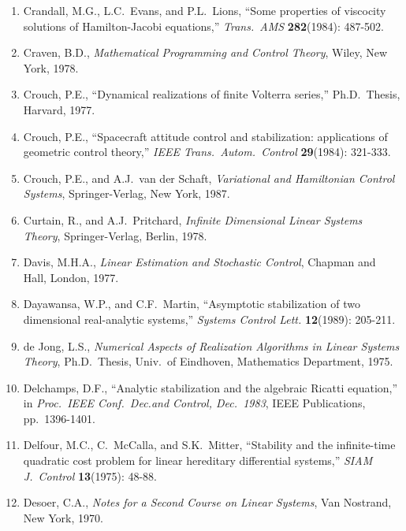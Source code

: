 \begin{enumerate}
\item
Crandall, M.G., L.C.\ Evans, and P.L.\ Lions, ``Some properties of viscocity
solutions of Ham\-ilton-Jac\-obi equations,'' {\it Trans.\ AMS} {\bf
282}(1984): 487-502.

\item
Craven, B.D., {\it Mathematical Programming and Control Theory}, Wiley, New
York, 1978.

\item
Crouch, P.E., ``Dynamical realizations of finite Volterra series,'' Ph.D.\
Thesis, Harvard, 1977.

\item
Crouch, P.E., ``Spacecraft attitude control and stabilization: applications of
geometric control theory,'' {\it IEEE Trans.\ Autom.\ Control} {\bf 29}(1984):
321-333.

\item
Crouch, P.E., and A.J.\ van der Schaft, {\it Variational and Hamiltonian
Control Systems}, Springer-Verlag, New York, 1987.

\item
Curtain, R., and A.J.\ Pritchard, {\it Infinite Dimensional Linear Systems
Theory}, Springer-Verlag, Berlin, 1978.

\item
Davis, M.H.A., {\it Linear Estimation and Stochastic Control}, Chapman and
Hall, London, 1977.

\item
Dayawansa, W.P., and C.F.\ Martin, ``Asymptotic stabilization of two
dimensional real-analytic systems,'' {\it Systems Control Lett.} {\bf
12}(1989): 205-211.

\item
de Jong, L.S., {\it Numerical Aspects of Realization Algorithms in Linear
Systems Theory}, Ph.D.\ Thesis, Univ.\ of Eindhoven, Mathematics Department,
1975.

\item
Delchamps, D.F., ``Analytic stabilization and the algebraic Ricatti
equation,'' in {\it Proc.\ IEEE Conf.\ Dec.and Control, Dec.\ 1983}, IEEE
Publications, pp.\ 1396-1401.

\item
Delfour, M.C., C.\ McCalla, and S.K.\ Mitter, ``Stability and the
infinite-time quadratic cost problem for linear hereditary differential
systems,'' {\it SIAM J.\ Control} {\bf 13}(1975): 48-88.

\item
Desoer, C.A., {\it Notes for a Second Course on Linear Systems}, Van Nostrand,
New York, 1970.


\end{enumerate}
